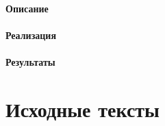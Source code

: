 \documentclass{article}
\begin{document}
\subsection{Описание}

\subsection{Реализация}

\subsection{Результаты}

\appendix

\newpage
\part{Исходные тексты}


\end{document}
